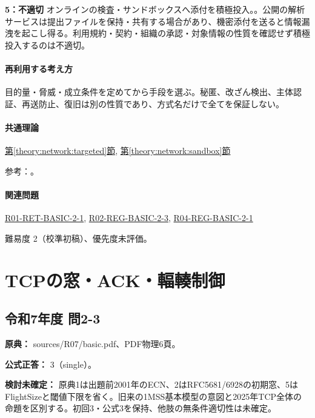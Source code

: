 \noindent\textbf{5：不適切} オンラインの検査・サンドボックスへ添付を積極投入。。公開の解析サービスは提出ファイルを保持・共有する場合があり、機密添付を送ると情報漏洩を起こし得る。利用規約・契約・組織の承認・対象情報の性質を確認せず積極投入するのは不適切。\par

\paragraph{再利用する考え方} 目的量・脅威・成立条件を定めてから手段を選ぶ。秘匿、改ざん検出、主体認証、再送防止、復旧は別の性質であり、方式名だけで全てを保証しない。

\paragraph{共通理論} \hyperref[theory:network:targeted]{第\ref*{theory:network:targeted}節}, \hyperref[theory:network:sandbox]{第\ref*{theory:network:sandbox}節}

\par 参考：\cite{net_target2020,net_target2023}。

\paragraph{関連問題} \hyperref[q:r01-ret-basic-2-1]{R01-RET-BASIC-2-1}, \hyperref[q:r02-reg-basic-2-3]{R02-REG-BASIC-2-3}, \hyperref[q:r04-reg-basic-2-1]{R04-REG-BASIC-2-1}

\par 難易度 2（校準初稿）、優先度未評価。

\section{TCPの窓・ACK・輻輳制御}

\subsection{令和7年度 問2-3}
\label{q:r07-reg-basic-2-3}

\noindent\textbf{原典：} sources/R07/basic.pdf、PDF物理6頁。

\textbf{公式正答：} 3（single）。

\par\textbf{検討未確定：} 原典1は出題前2001年のECN、2はRFC5681/6928の初期窓、5はFlightSizeと閾値下限を省く。旧来の1MSS基本模型の意図と2025年TCP全体の命題を区別する。初回3・公式3を保持、他肢の無条件適切性は未確定。

